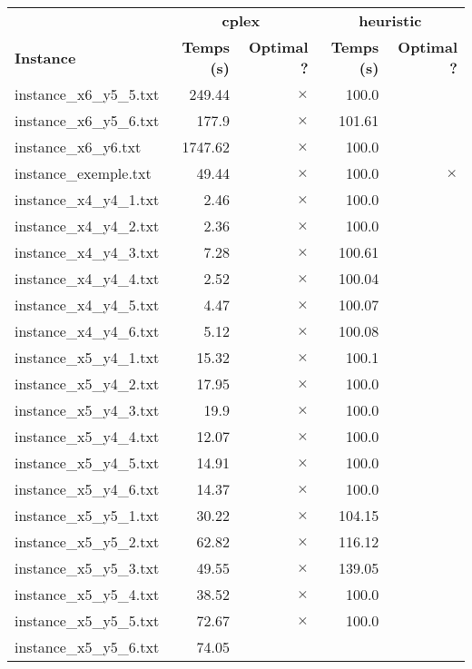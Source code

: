 \documentclass{article}
\begin{document}
\newpage
\begin{center}
\renewcommand{\arraystretch}{1.4} 
 \begin{tabular}{lrrrr}
	\hline
 & \multicolumn{2}{c}{\textbf{cplex}} & \multicolumn{2}{c}{\textbf{heuristic}}\\
\textbf{Instance}  & \textbf{Temps (s)} & \textbf{Optimal ?}  & \textbf{Temps (s)} & \textbf{Optimal ?} \\\hline

instance\_x6\_y5\_5.txt & 249.44 & 
$\times$
 & 100.0 & 
\\
instance\_x6\_y5\_6.txt & 177.9 & 
$\times$
 & 101.61 & 
\\
instance\_x6\_y6.txt & 1747.62 & 
$\times$
 & 100.0 & 
\\
instance\_exemple.txt & 49.44 & 
$\times$
 & 100.0 & 
$\times$
\\
instance\_x4\_y4\_1.txt & 2.46 & 
$\times$
 & 100.0 & 
\\
instance\_x4\_y4\_2.txt & 2.36 & 
$\times$
 & 100.0 & 
\\
instance\_x4\_y4\_3.txt & 7.28 & 
$\times$
 & 100.61 & 
\\
instance\_x4\_y4\_4.txt & 2.52 & 
$\times$
 & 100.04 & 
\\
instance\_x4\_y4\_5.txt & 4.47 & 
$\times$
 & 100.07 & 
\\
instance\_x4\_y4\_6.txt & 5.12 & 
$\times$
 & 100.08 & 
\\
instance\_x5\_y4\_1.txt & 15.32 & 
$\times$
 & 100.1 & 
\\
instance\_x5\_y4\_2.txt & 17.95 & 
$\times$
 & 100.0 & 
\\
instance\_x5\_y4\_3.txt & 19.9 & 
$\times$
 & 100.0 & 
\\
instance\_x5\_y4\_4.txt & 12.07 & 
$\times$
 & 100.0 & 
\\
instance\_x5\_y4\_5.txt & 14.91 & 
$\times$
 & 100.0 & 
\\
instance\_x5\_y4\_6.txt & 14.37 & 
$\times$
 & 100.0 & 
\\
instance\_x5\_y5\_1.txt & 30.22 & 
$\times$
 & 104.15 & 
\\
instance\_x5\_y5\_2.txt & 62.82 & 
$\times$
 & 116.12 & 
\\
instance\_x5\_y5\_3.txt & 49.55 & 
$\times$
 & 139.05 & 
\\
instance\_x5\_y5\_4.txt & 38.52 & 
$\times$
 & 100.0 & 
\\
instance\_x5\_y5\_5.txt & 72.67 & 
$\times$
 & 100.0 & 
\\
instance\_x5\_y5\_6.txt & 74.05 & 

\end{tabular}
\end{center}
\end{document}
